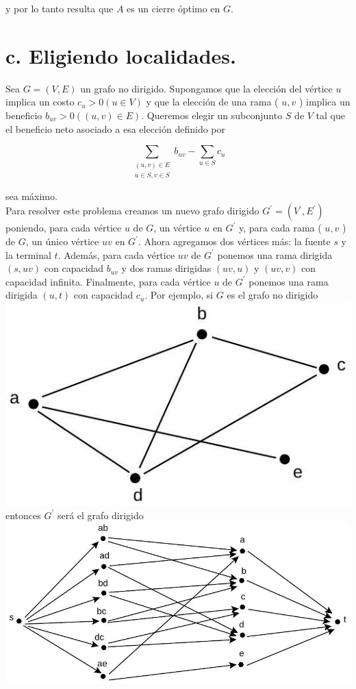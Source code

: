 \documentclass[10pt]{article}
\begin{document}
y por lo tanto resulta que $A$ es un cierre óptimo en $G$.

\section*{c. Eligiendo localidades.}
Sea $G=(V, E)$ un grafo no dirigido. Supongamos que la elección del vértice $u$ implica un costo $c_{u}>0 (u \in V)$ y que la elección de una rama ( $u, v$ ) implica un beneficio $b_{u v}>0((u, v) \in E)$. Queremos elegir un subconjunto $S$ de $V$ tal que el beneficio neto asociado a esa elección definido por

$$
\sum_{\substack{(u, v) \in E \\ u \in S, v \in S}} b_{u v}-\sum_{u \in S} c_{u}
$$

sea máximo.\\
Para resolver este problema creamos un nuevo grafo dirigido $G^{\prime}=\left(V^{\prime}, E^{\prime}\right)$ poniendo, para cada vértice $u$ de $G$, un vértice $u$ en $G^{\prime}$ y, para cada rama ( $u, v$ ) de $G$, un único vértice $u v$ en $G^{\prime}$. Ahora agregamos dos vértices más: la fuente $s$ y la terminal $t$. Además, para cada vértice $u v$ de $G^{\prime}$ ponemos una rama dirigida $(s, u v)$ con capacidad $b_{u v}$ y dos ramas dirigidas $(u v, u)$ y $(u v, v)$ con capacidad infinita. Finalmente, para cada vértice $u$ de $G^{\prime}$ ponemos una rama dirigida $(u, t)$ con capacidad $c_{u}$. Por ejemplo, si $G$ es el grafo no dirigido\\
\includegraphics[max width=\textwidth, center]{2025_09_05_aa5f7b8425e7dd302062g-18}\\
entonces $G^{\prime}$ será el grafo dirigido\\
\includegraphics[max width=\textwidth, center]{2025_09_05_aa5f7b8425e7dd302062g-18(1)}
\end{document}
